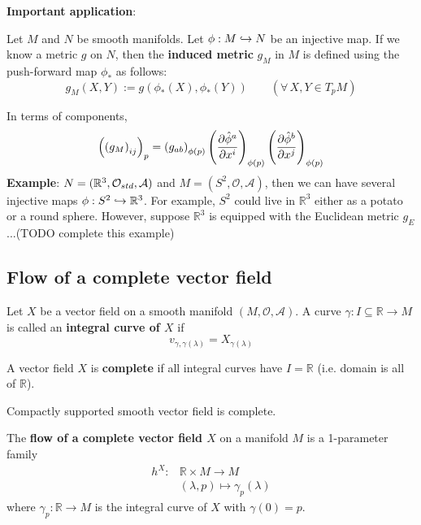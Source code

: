 \textbf{Important application}:
\begin{definition}
Let $M$ and $N$ be smooth manifolds. Let $\phi : M \injmapto N$ be an injective map. If we know a metric $g$ on $N$, then the \textbf{induced metric} $g_M$ in $M$ is defined using the push-forward map $\phi_\ast$ as follows:
\begin{equation}\label{eq_inducedMetric}
\boxed{g_M(X,Y) := g\left(\phi_\ast(X),\phi_\ast(Y)\right)} \quad \quad (\forall \, X, Y \in T_pM)
\end{equation}
\end{definition}
In terms of components,
\begin{equation}
\left(\left(g_M\right)_{ij}\right)_p = \left(g_{ab}\right)_{\phi(p)} \left(\cibasis[\hat{\phi}^a]{x^i}\right)_{\phi(p)} \left(\cibasis[\hat{\phi}^b]{x^j}\right)_{\phi(p)}
\end{equation}
\textbf{Example}: $N = (\mathbb{R}^3, \stdtop, \mathcal{A})$ and $M = (S^2, \mathcal{O}, \mathcal{A})$, then we can have several injective maps $\phi : S^2 \injmapto \mathbb{R}^3$. For example, $S^2$ could live in $\mathbb{R}^3$ either as a potato or a round sphere. However, suppose $\mathbb{R}^3$ is equipped with the Euclidean metric $g_E$ ...(TODO complete this example)

\subsection{Flow of a complete vector field}
\begin{definition}
Let $X$ be a vector field on a smooth manifold $(M,\mathcal{O},\mathcal{A})$. A curve $\gamma : I \subseteq \mathbb{R} \to M$ is called an \textbf{integral curve of $X$} if 
\[
v_{\gamma,\gamma(\lambda)} = X_{\gamma(\lambda)}
\]
\end{definition}

\begin{definition} A vector field $X$ is \textbf{complete} if all integral curves have $I = \mathbb{R}$ (i.e. domain is all of $\mathbb{R}$).
\end{definition}

\begin{theorem}
Compactly supported smooth vector field is complete.  
\end{theorem}

\begin{definition} The \textbf{flow of a complete vector field $X$} on a manifold $M$ is a 1-parameter family
\begin{align*}
h^X : & \mathbb{R} \times M \to M \\
& (\lambda, p) \mapsto \gamma_p(\lambda)
\end{align*}
where $\gamma_p : \mathbb{R} \to M$ is the integral curve of $X$ with $\gamma(0) = p$. 
\end{definition}

